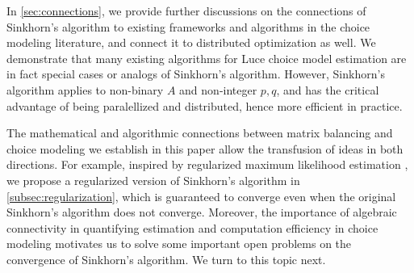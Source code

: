 In \cref{sec:connections}, we provide further discussions on the connections of Sinkhorn's algorithm to existing frameworks and algorithms in the choice modeling literature, and connect it to distributed optimization as well. We demonstrate that many existing algorithms for Luce choice model estimation are in fact special cases or analogs of Sinkhorn's algorithm. However, Sinkhorn's algorithm applies to non-binary $A$ and non-integer $p,q$, and has the critical advantage of being paralellized and distributed, hence more efficient in practice. %

The mathematical and algorithmic connections between matrix balancing and choice modeling we establish in this paper allow the transfusion of ideas in both directions. For example, inspired by regularized maximum likelihood estimation \citep{maystre2017choicerank}, we propose a regularized version of Sinkhorn's algorithm in \cref{subsec:regularization}, which is guaranteed to converge even when the original Sinkhorn's algorithm does not converge. Moreover, the importance of algebraic connectivity in quantifying estimation and computation efficiency in choice modeling motivates us to solve some important open problems on the convergence of Sinkhorn's algorithm. We turn to this topic next. 



